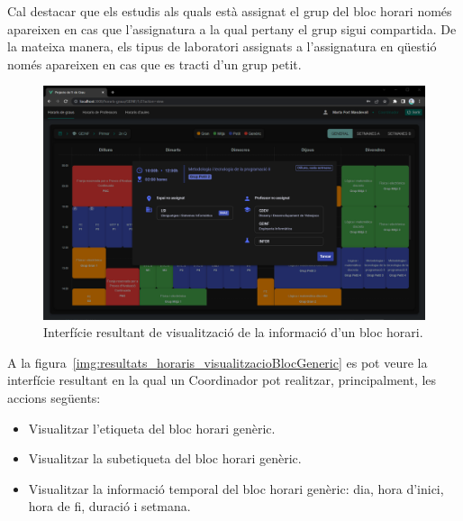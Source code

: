 \documentclass[a4paper,12pt]{ThesisStyle}
\begin{document}
Cal destacar que els estudis als quals està assignat el grup del bloc horari només apareixen en cas que l'assignatura a la qual pertany el grup sigui compartida. De la mateixa manera, els tipus de laboratori assignats a l'assignatura en qüestió només apareixen en cas que es tracti d'un grup petit.

\newpage

\begin{figure}[H]
  \centering
  \includegraphics[width=\textwidth]{assets/results/horaris/visualitzacioBloc.png}
  \caption{\label{img:resultats_horaris_visualitzacioBloc}Interfície resultant de visualització de la informació d'un bloc horari.}
\end{figure}

\newpage

A la figura~\ref{img:resultats_horaris_visualitzacioBlocGeneric} es pot veure la interfície resultant en la qual un Coordinador pot realitzar, principalment, les accions següents:
\begin{itemize}
  \item Visualitzar l'etiqueta del bloc horari genèric.
  \item Visualitzar la subetiqueta del bloc horari genèric.
  \item Visualitzar la informació temporal del bloc horari genèric: dia, hora d'inici, hora de fi, duració i setmana.
\end{itemize}
\end{document}

